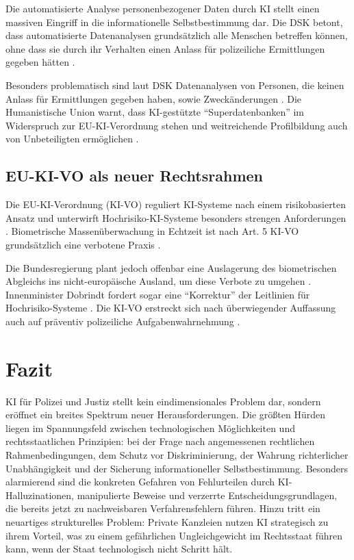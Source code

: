 \documentclass[12pt,a4paper]{article}
\begin{document}
	Die automatisierte Analyse personenbezogener Daten durch KI stellt einen massiven Eingriff in die informationelle Selbstbestimmung dar. Die DSK betont, dass automatisierte Datenanalysen grundsätzlich alle Menschen betreffen können, ohne dass sie durch ihr Verhalten einen Anlass für polizeiliche Ermittlungen gegeben hätten \cite{DSK2025}.
	
	Besonders problematisch sind laut DSK Datenanalysen von Personen, die keinen Anlass für Ermittlungen gegeben haben, sowie Zweckänderungen \cite{Datenschutzticker2025}. Die Humanistische Union warnt, dass KI-gestützte \enquote{Superdatenbanken} im Widerspruch zur EU-KI-Verordnung stehen und weitreichende Profilbildung auch von Unbeteiligten ermöglichen \cite{HumanUnion2025}.
	
	\subsection{EU-KI-VO als neuer Rechtsrahmen}
	
	Die EU-KI-Verordnung (KI-VO) reguliert KI-Systeme nach einem risikobasierten Ansatz und unterwirft Hochrisiko-KI-Systeme besonders strengen Anforderungen \cite{Kriminalpolizei2026}. Biometrische Massenüberwachung in Echtzeit ist nach Art. 5 KI-VO grundsätzlich eine verbotene Praxis \cite{RAV2025}.
	
	Die Bundesregierung plant jedoch offenbar eine Auslagerung des biometrischen Abgleichs ins nicht-europäische Ausland, um diese Verbote zu umgehen \cite{Gruene2026}. Innenminister Dobrindt fordert sogar eine \enquote{Korrektur} der Leitlinien für Hochrisiko-Systeme \cite{Dobrindt2026}. Die KI-VO erstreckt sich nach überwiegender Auffassung auch auf präventiv polizeiliche Aufgabenwahrnehmung \cite{Kriminalpolizei2026}.
	
	\section{Fazit}
	
	KI für Polizei und Justiz stellt kein eindimensionales Problem dar, sondern eröffnet ein breites Spektrum neuer Herausforderungen. Die größten Hürden liegen im Spannungsfeld zwischen technologischen Möglichkeiten und rechtsstaatlichen Prinzipien: bei der Frage nach angemessenen rechtlichen Rahmenbedingungen, dem Schutz vor Diskriminierung, der Wahrung richterlicher Unabhängigkeit und der Sicherung informationeller Selbstbestimmung. Besonders alarmierend sind die konkreten Gefahren von Fehlurteilen durch KI-Halluzinationen, manipulierte Beweise und verzerrte Entscheidungsgrundlagen, die bereits jetzt zu nachweisbaren Verfahrensfehlern führen. Hinzu tritt ein neuartiges strukturelles Problem: Private Kanzleien nutzen KI strategisch zu ihrem Vorteil, was zu einem gefährlichen Ungleichgewicht im Rechtsstaat führen kann, wenn der Staat technologisch nicht Schritt hält.
	
\end{document}
